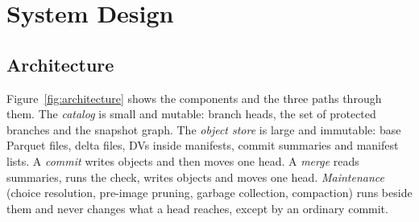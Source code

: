 \documentclass[sigconf, nonacm]{acmart}
\begin{document}
\section{System Design}
\label{sec:design}

\subsection{Architecture}
\label{sec:design_arch}

Figure~\ref{fig:architecture} shows the components and the three paths through them. The \emph{catalog} is small and mutable: branch heads, the set of protected branches and the snapshot graph. The \emph{object store} is large and immutable: base Parquet files, delta files, DVs inside manifests, commit summaries and manifest lists. A \emph{commit} writes objects and then moves one head. A \emph{merge} reads summaries, runs the check, writes objects and moves one head. \emph{Maintenance} (choice resolution, pre-image pruning, garbage collection, compaction) runs beside them and never changes what a head reaches, except by an ordinary commit.
\end{document}
